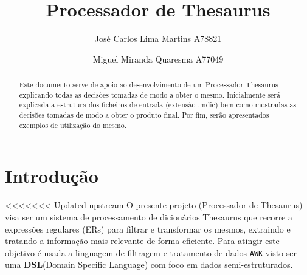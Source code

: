 \documentclass{llncs}
\begin{document}
 \mainmatter
\title{Processador de Thesaurus}
\author{José Carlos Lima Martins A78821 \and
        Miguel Miranda Quaresma A77049}

\maketitle

\justify

\begin{abstract}
Este documento serve de apoio ao desenvolvimento de um Processador Thesaurus explicando todas as decisões tomadas de modo a obter o mesmo. Inicialmente será explicada a estrutura dos ficheiros de entrada (extensão .mdic) bem como mostradas as decisões tomadas de modo a obter o produto final. Por fim, serão apresentados exemplos de utilização do mesmo.
\end{abstract}

\section{Introdução}
<<<<<<< Updated upstream
O presente projeto (Processador de Thesaurus) visa ser um sistema de processamento de dicionários Thesaurus que recorre a expressões regulares (ERs) para filtrar e transformar os mesmos, extraindo e tratando a informação mais relevante de forma eficiente. Para atingir este objetivo é usada a linguagem de filtragem e tratamento de dados \texttt{AWK} visto ser uma \textbf{DSL}(Domain Specific Language) com foco em dados semi-estruturados.
\end{document}
